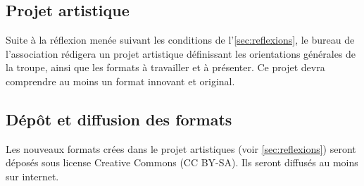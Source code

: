 \documentclass[a4paper,french,10pt]{article}
\begin{document}
\subsection{Projet artistique}
\label{sec:projet}
Suite à la réflexion menée suivant les conditions de l'\ref{sec:reflexions}, le
bureau de l'association rédigera un projet artistique définissant les
orientations générales de la troupe, ainsi que les formats à
travailler et à présenter. Ce projet devra comprendre au moins un
format innovant et original.  





\subsection{Dépôt et diffusion des formats}
\label{sec:depot-et-diffusion}
Les nouveaux formats crées dans le projet artistiques (voir \ref{sec:reflexions}) seront déposés sous license Creative Commons (CC BY-SA). Ils
seront diffusés au moins sur internet.  

\end{document}
